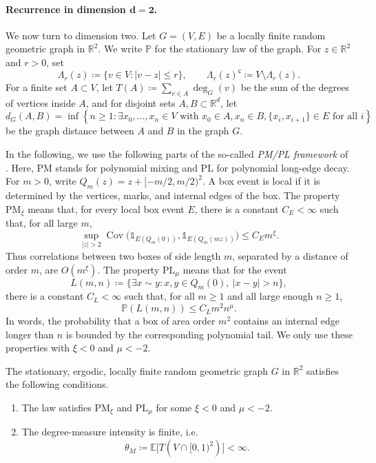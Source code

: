 \documentclass[11pt,a4paper]{scrartcl}
\renewcommand{\P}{\mathbb{P}}
\newcommand{\E}{\mathbb{E}}
\newcommand{\R}{\mathbb{R}}
\newcommand{\1}{\mathbb{1}}
\begin{document}
\paragraph{Recurrence in dimension \(\boldsymbol{d=2}\). }
We now turn to dimension two.  Let \(G=(V,E)\) be a locally finite random
geometric graph in \(\R^2\).  We write \(\P\) for the stationary law
of the graph.  For \(z\in\R^2\) and \(r>0\), set
\[
  \Lambda_r(z)\coloneqq \{v\in V: |v-z|\le r\},
  \qquad
  \Lambda_r(z)^{\mathsf c}\coloneqq V\setminus \Lambda_r(z).
\]
For a finite set \(A\subset V\),
let \(T(A)\coloneqq \sum_{v\in A}\deg_G(v)\) be the sum of the degrees of vertices inside $A$, and for disjoint sets $A,B \subset \R^d$, let
\begin{equation*}
	d_G(A,B) = \inf\left\{n \geq 1 : \exists x_0,\ldots,x_n \in V \text{ with } x_0 \in A, x_n \in B, \{x_i,x_{i+1}\} \in E \text{ for all }i\right\}
\end{equation*}
be the graph distance between $A$ and $B$ in the graph $G$.

In the following, we use the following parts of the so-called \emph{PM/PL framework} of
\cite{lue2024spatialrandomgraphsweak}.  Here,
\(\mathrm{PM}\) stands for polynomial mixing and \(\mathrm{PL}\) for
polynomial long-edge decay.  For \(m>0\), write
\(Q_m(z)=z+[-m/2,m/2)^2\).  A box event is local if it is determined by the
vertices, marks, and internal edges of the box.  The property
\(\mathrm{PM}_\xi\) means that, for every local box event \(E\), there is a
constant \(C_E<\infty\) such that, for all large \(m\),
\[
  \sup_{|z|>2}
  \operatorname{Cov}\big(
    \1_{E(Q_m(0))},\1_{E(Q_m(mz))}
  \big)
  \le C_E m^\xi.
\]
Thus correlations between two boxes of side length \(m\), separated by a
distance of order \(m\), are \(O(m^\xi)\).  The property
\(\mathrm{PL}_\mu\) means that for the event
\[
  L(m,n)\coloneqq \{\exists x\sim y:x,y\in Q_m(0),\ |x-y|>n\},
\]
there is a constant \(C_L<\infty\) such that, for all \(m\ge1\) and all large enough
\(n \geq 1\),
\[
  \P(L(m,n))\le C_L m^2 n^\mu.
\]
In words, the probability that a box of area order \(m^2\) contains an
internal edge longer than \(n\) is bounded by the corresponding polynomial
tail.  We only use these properties with \(\xi<0\) and \(\mu<-2\).

\begin{assumption}
\label{ass:planar-pmpl-input}
The stationary, ergodic, locally finite random geometric graph \(G\) in
\(\R^2\) satisfies the following conditions.
\begin{enumerate}[label=(\roman*)]
\item The law satisfies \(\mathrm{PM}_\xi\) and \(\mathrm{PL}_\mu\) for some
\(\xi<0\) and \(\mu<-2\).
\item The degree-measure intensity is finite, i.e.\
\[
  \theta_M\coloneqq \E\big[T\left(V\cap [0,1)^2 \right)\big]<\infty.
\]
\end{enumerate}
\end{assumption}
\end{document}
